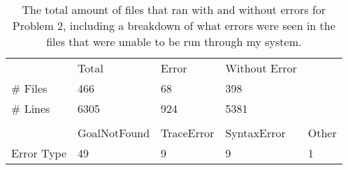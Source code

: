 \begin{table}[htbp]
\centering
\begin{tabular}{lllll}
\multicolumn{1}{l|}{}           & Total        & Error      & Without Error &       \\ \cline{1-4}
\multicolumn{1}{l|}{\# Files}   & 466          & 68         & 398           &       \\
\multicolumn{1}{l|}{\# Lines}   & 6305         & 924        & 5381          &       \\
                                &              &            &               &       \\
\multicolumn{1}{l|}{}           & GoalNotFound & TraceError & SyntaxError   & Other \\ \hline
\multicolumn{1}{l|}{Error Type} & 49           & 9          & 9             & 1    
\end{tabular}
\caption{The total amount of files that ran with and without errors for Problem 2, including a breakdown of what errors were seen in the files that were unable to be run through my system.}
\end{table}